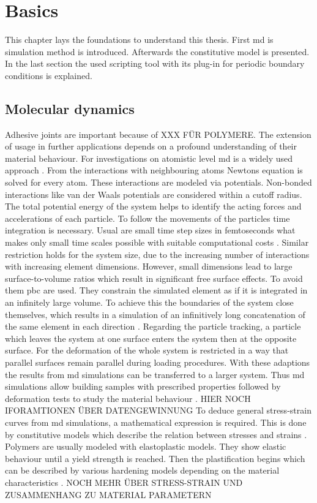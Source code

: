 \chapter{Basics} \label{chap: basics}
This chapter lays the foundations to understand this thesis. First \acrfull{md} is simulation method is introduced. Afterwards the constitutive model is presented. In the last section the used scripting tool with its plug-in for periodic boundary conditions is explained.  

\section{Molecular dynamics} \label{sec: MDBasics}
Adhesive joints are important because of XXX FÜR POLYMERE. The extension of usage in further applications depends on a profound understanding of their material behaviour. For investigations on atomistic level \acrfull{md} is a widely used approach  \cite{ries_mechanical_2024}. From the interactions with neighbouring atoms Newtons equation is solved for every atom. These interactions are modeled via potentials. Non-bonded interactions like van der Waals potentials are considered within a cutoff radius. The total potential energy of the system helps to identify the acting forces and accelerations of each particle. To follow the movements of the particles time integration is necessary. Usual are small time step sizes in femtoseconds what makes only small time scales possible with suitable computational costs \cite{ries_mechanical_2024}. Similar restriction holds for the system size, due to the increasing number of interactions with increasing element dimensions. However, small dimensions lead to large surface-to-volume ratios which result in significant free surface effects. To avoid them \acrfull{pbc} are used. They constrain the simulated element as if it is integrated in an infinitely large volume. To achieve this the boundaries of the system close themselves, which results in a simulation of an infinitively long concatenation of the same element in each direction \cite{gorbunov_periodic_2022}. Regarding the particle tracking, a particle which leaves the system at one surface enters the system then at the opposite surface. For the deformation of the whole system is restricted in a way that parallel surfaces remain parallel during loading procedures. With these adaptions the results from \acrshort{md} simulations can be transferred to a larger system. Thus \acrshort{md} simulations allow building samples with prescribed properties followed by deformation tests to study the material behaviour \cite{buyukozturk_structural_2011}. HIER NOCH IFORAMTIONEN ÜBER DATENGEWINNUNG To deduce general stress-strain curves from \acrshort{md} simulations, a mathematical expression is required. This is done by constitutive models which describe the relation between stresses and strains \cite{mergheim_lecture_nodate}. Polymers are usually modeled with elastoplastic models. They show elastic behaviour until a yield strength is reached. Then the plastification begins which can be described by various hardening models depending on the material characteristics \cite{mergheim_lecture_nodate}. NOCH MEHR ÜBER STRESS-STRAIN UND ZUSAMMENHANG ZU MATERIAL PARAMETERN


